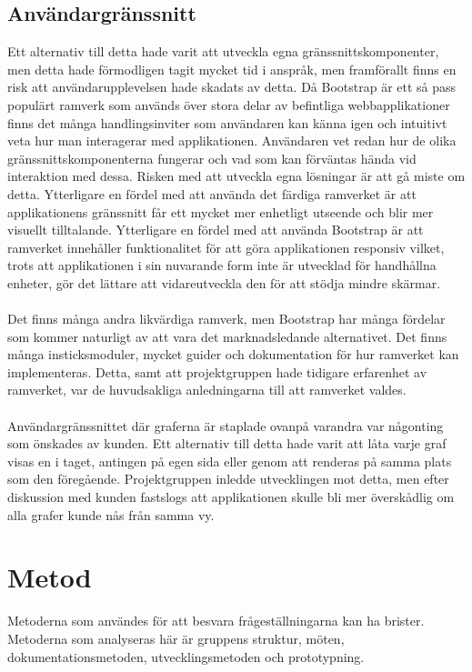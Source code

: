 \subsection{Användargränssnitt}
Ett alternativ till detta hade varit att utveckla egna gränssnittskomponenter, men detta hade förmodligen tagit mycket tid i anspråk, men framförallt finns en risk att användarupplevelsen hade skadats av detta. Då Bootstrap är ett så pass populärt ramverk som används över stora delar av befintliga webbapplikationer finns det många handlingsinviter som användaren kan känna igen och intuitivt veta hur man interagerar med applikationen. Användaren vet redan hur de olika gränssnittskomponenterna fungerar och vad som kan förväntas hända vid interaktion med dessa.\cite{arvolaboken} Risken med att utveckla egna lösningar är att gå miste om detta. Ytterligare en fördel med att använda det färdiga ramverket är att applikationens gränssnitt får ett mycket mer enhetligt utseende och blir mer visuellt tilltalande. Ytterligare en fördel med att använda Bootstrap är att ramverket innehåller funktionalitet för att göra applikationen responsiv vilket, trots att applikationen i sin nuvarande form inte är utvecklad för handhållna enheter, gör det lättare att vidareutveckla den för att stödja mindre skärmar.\\
\\
Det finns många andra likvärdiga ramverk, men Bootstrap har många fördelar som kommer naturligt av att vara det marknadsledande alternativet. Det finns många insticksmoduler, mycket guider och dokumentation för hur ramverket kan implementeras. Detta, samt att projektgruppen hade tidigare erfarenhet av ramverket, var de huvudsakliga anledningarna till att ramverket valdes.\\
\\
Användargränssnittet där graferna är staplade ovanpå varandra var någonting som önskades av kunden. Ett alternativ till detta hade varit att låta varje graf visas en i taget, antingen på egen sida eller genom att renderas på samma plats som den föregående. Projektgruppen inledde utvecklingen mot detta, men efter diskussion med kunden fastslogs att applikationen skulle bli mer överskådlig om alla grafer kunde nås från samma vy.
\section{Metod}
\label{sec:discussion-method}
Metoderna som användes för att besvara frågeställningarna kan ha brister. Metoderna som analyseras här är gruppens struktur, möten, dokumentationsmetoden, utvecklingsmetoden och prototypning.

